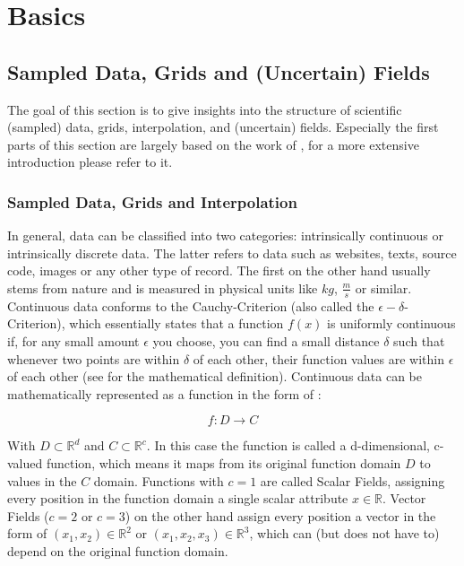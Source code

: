 
\chapter{Basics}
\label{ch:basics}


\section{Sampled Data, Grids and (Uncertain) Fields}
\label{sec:uncertainfields}

The goal of this section is to give insights into the structure of scientific (sampled) data, grids, interpolation, and (uncertain) fields. 
Especially the first parts of this section are largely based on the work of , for a more extensive introduction please refer to it. 

\subsection{Sampled Data, Grids and Interpolation}


In general, data can be classified into two categories: intrinsically continuous or intrinsically discrete data. 
The latter refers to data such as websites, texts, source code, images or any other type of record. 
The first on the other hand usually stems from nature and is measured in physical units like $kg$, $\frac{m}{s}$ or similar.
Continuous data conforms to the Cauchy-Criterion (also called the $\epsilon - \delta$-Criterion), which essentially states that a function $f(x)$ is uniformly continuous if, for any small amount $\epsilon$ you choose, you can find a small distance $\delta$ such that whenever two points are within $\delta$ of each other, their function values are within $\epsilon$ of each other (see \cite{telea2014data} for the mathematical definition). 
Continuous data can be mathematically represented as a function in the form of \cite{telea2014data}:

\begin{equation}
  f: D \rightarrow C
  \label{eq:continous data}
\end{equation}

With $D \subset \mathbb{R}^d$ and $C \subset \mathbb{R}^c$. 
In this case the function is called a d-dimensional, c-valued function, which means it maps from its original function domain $D$ to values in the $C$ domain. 
Functions with $c=1$ are called Scalar Fields, assigning every position in the function domain a single scalar attribute $x \in \mathbb{R}$. 
Vector Fields ($c=2$ or $c=3$) on the other hand assign every position a vector in the form of $(x_1, x_2) \in \mathbb{R}^2$ or $(x_1, x_2, x_3) \in \mathbb{R}^3$, which can (but does not have to) depend on the original function domain. 

